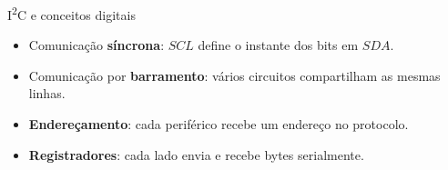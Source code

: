 \begin{frame}{I\textsuperscript{2}C e conceitos digitais}
\begin{itemize}
  \item Comunicação \textbf{síncrona}: \(SCL\) define o instante dos bits em \(SDA\).
  \item Comunicação por \textbf{barramento}: vários circuitos compartilham as mesmas linhas.
  \item \textbf{Endereçamento}: cada periférico recebe um endereço no protocolo.
  \item \textbf{Registradores}: cada lado envia e recebe bytes serialmente.
\end{itemize}
\end{frame}
